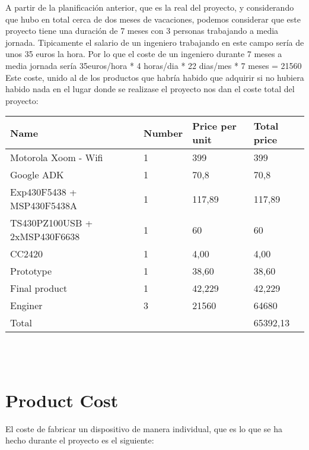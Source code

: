 	A partir de la planificación anterior, que es la real del proyecto, y considerando que hubo en total cerca de dos meses de vacaciones, podemos considerar que este proyecto tiene una duración de 7 meses con 3 personas trabajando a media jornada. Tipicamente el salario de un ingeniero trabajando en este campo sería de unos 35 euros la hora. Por lo que el coste de un ingeniero durante 7 meses a media jornada sería 35euros/hora * 4 horas/dia * 22 dias/mes * 7 meses = 21560\\

	Este coste, unido al de los productos que habría habido que adquirir si no hubiera habido nada en el lugar donde se realizase el proyecto nos dan el coste total del proyecto:\\

\begin{tabular}{| p{5cm} |l | l | l |} 
\hline
   Name & Number& Price per unit & Total price\\ \hline
   Motorola Xoom - Wifi & 1 & 399 & 399\\ \hline
   Google ADK & 1 & 70,8 & 70,8\\ \hline
   Exp430F5438 + MSP430F5438A & 1 & 117,89 & 117,89\\ \hline
   TS430PZ100USB + 2xMSP430F6638 & 1 & 60 & 60\\ \hline
   CC2420 & 1 & 4,00 & 4,00\\ \hline
   Prototype & 1 & 38,60 & 38,60\\ \hline
   Final product & 1 & 42,229 & 42,229\\ \hline
   Enginer & 3 & 21560 & 64680\\ \hline
   Total & & & 65392,13\\ \hline
\hline
\end{tabular}\\\\


\chapter{Product Cost}
\label{ch:cost}

	El coste de fabricar un dispositivo de manera individual, que es lo que se ha hecho durante el proyecto es el siguiente:\\

